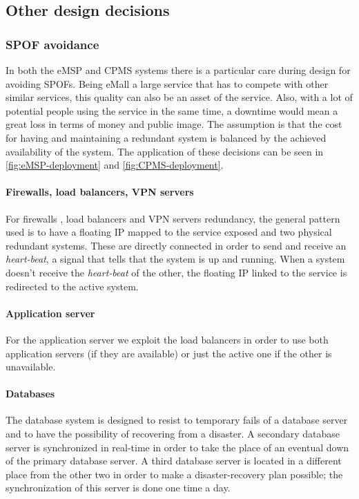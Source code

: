 \subsection{Other design decisions}
\subsubsection{\ac{SPOF} avoidance}
In both the \ac{eMSP} and \ac{CPMS} systems there is a particular care during design for avoiding \acp{SPOF}. Being \ac{eMall} a large service that has to compete with other similar services, this quality can also be an asset of the service. Also, with a lot of potential people using the service in the same time, a downtime would mean a great loss in terms of money and public image. The assumption is that the cost for having and maintaining a redundant system is balanced by the achieved availability of the system.
The application of these decisions can be seen in \autoref{fig:eMSP-deployment} and \autoref{fig:CPMS-deployment}.
\paragraph{Firewalls, load balancers, \ac{VPN} servers}
For firewalls \cite{ref:redundant-firewalls}, load balancers \cite{ref:redundant-load-balancers} and \ac{VPN} servers \cite{ref:redundant-VPN-servers} redundancy, the general pattern used is to have a floating IP \cite{ref:floating-ip} mapped to the service exposed and two physical redundant systems. These are directly connected in order to send and receive an \textit{heart-beat}, a signal that tells that the system is up and running.
When a system doesn't receive the \textit{heart-beat} of the other, the floating IP linked to the service is redirected to the active system.
\paragraph{Application server}
For the application server we exploit the load balancers in order to use both application servers (if they are available) or just the active one if the other is unavailable.
\paragraph{Databases}
The database system is designed to resist to temporary fails of a database server and to have the possibility of recovering from a disaster. A secondary database server is synchronized in real-time in order to take the place of an eventual down of the primary database server. A third database server is located in a different place from the other two in order to make a disaster-recovery plan possible; the synchronization of this server is done one time a day.
\clearpage